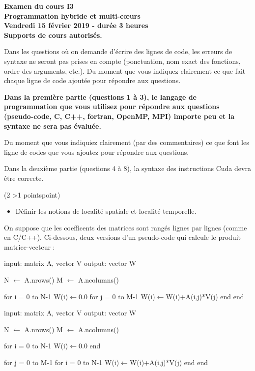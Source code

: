 \documentclass[12pt]{report}
\newcounter{cptPoints}
\newcounter{cptQuestions}
\newcommand\question[2]{\bigskip\par\addtocounter{cptQuestions}{1}\addtocounter{cptPoints}{#2}{\bf Question #1 n\textsuperscript{o} \thecptQuestions} (#2 \ifnum #2>1 points\else point\fi)\par}
\begin{document}
	\begin{center}\Large\bf
			Examen du cours I3\\
			Programmation hybride et multi-c\oe urs\\[0.4cm]
			Vendredi 15 f\'evrier 2019 - dur\'ee 3 heures\\
			Supports de cours autoris\'es.
		\end{center}
	\bigskip
	Dans les questions o\`u on demande d'\'ecrire des lignes de code, les erreurs de syntaxe ne seront pas prises en compte (ponctuation, nom exact des fonctions, ordre des arguments, etc.). Du moment que vous indiquez clairement ce que fait chaque ligne de code ajout\'ee pour r\'epondre aux questions.
		
	{\bf Dans la première partie (questions 1 \`a 3), le langage de programmation que vous utilisez pour r\'epondre aux questions (pseudo-code, C, C++, fortran, OpenMP, MPI) importe peu et la syntaxe ne sera pas \'evalu\'ee.
	
	Du moment que vous indiquiez clairement (par des commentaires) ce que font les ligne de codes que vous ajoutez pour r\'epondre aux questions.
	
	Dans la deuxi\`eme partie (questions 4 \`a 8), la syntaxe des instructions Cuda devra \^etre correcte.}
	
	\question{}2
	\medskip
	
	\begin{itemize}
		\item D\'efinir les notions de localit\'e spatiale et localité temporelle.
	\end{itemize}
	
	On suppose que les coefficents des matrices sont rang\'es lignes par lignes (comme en C/C++).
	Ci-dessous, deux versions d'un pseudo-code qui calcule le produit matrice-vecteur :
	
\vspace{-10pt}
\begin{minipage}[t]{0.5\textwidth}
\begin{algorithm}
input: matrix A, vector V
output: vector W
	
N $\gets$ A.nrows()
M $\gets$ A.ncolumns()

for i = 0 to N-1
   W(i)$\gets$0.0
   for j = 0 to M-1
      W(i)$\gets$W(i)+A(i,j)*V(j)
   end
end       
\end{algorithm}
\end{minipage}
\begin{minipage}[t]{0.5\textwidth}
\begin{algorithm}
input: matrix A, vector V
output: vector W

N $\gets$ A.nrows()
M $\gets$ A.ncolumns()

for i = 0 to N-1
   W(i)$\gets$0.0
end

for j = 0 to M-1
   for i = 0 to N-1
       W(i)$\gets$W(i)+A(i,j)*V(j)
   end
end       
\end{algorithm}
\end{minipage}
\end{document}

